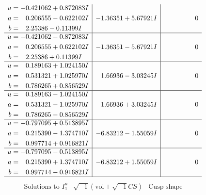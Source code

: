 \documentclass[1p]{elsarticle_modified}
\theoremstyle{definition}
\newcommand{\I}{\sqrt{-1}}
\begin{document}
$$\begin{array}{c|c|c}
\begin{aligned}
u &= -0.421062 + 0.872083 I \\
a &= \phantom{-}0.206555 - 0.622102 I \\
b &= \phantom{-}2.25386 - 0.11399 I\end{aligned}
 & -1.36351 + 5.67921 I & \phantom{-0.000000 } 0 \\ \hline\begin{aligned}
u &= -0.421062 - 0.872083 I \\
a &= \phantom{-}0.206555 + 0.622102 I \\
b &= \phantom{-}2.25386 + 0.11399 I\end{aligned}
 & -1.36351 - 5.67921 I & \phantom{-0.000000 } 0 \\ \hline\begin{aligned}
u &= \phantom{-}0.189163 + 1.024150 I \\
a &= \phantom{-}0.531321 + 1.025970 I \\
b &= \phantom{-}0.786265 + 0.856529 I\end{aligned}
 & \phantom{-}1.66936 - 3.03245 I & \phantom{-0.000000 } 0 \\ \hline\begin{aligned}
u &= \phantom{-}0.189163 - 1.024150 I \\
a &= \phantom{-}0.531321 - 1.025970 I \\
b &= \phantom{-}0.786265 - 0.856529 I\end{aligned}
 & \phantom{-}1.66936 + 3.03245 I & \phantom{-0.000000 } 0 \\ \hline\begin{aligned}
u &= -0.797095 + 0.513895 I \\
a &= \phantom{-}0.215390 - 1.374710 I \\
b &= \phantom{-}0.997714 + 0.916821 I\end{aligned}
 & -6.83212 - 1.55059 I & \phantom{-0.000000 } 0 \\ \hline\begin{aligned}
u &= -0.797095 - 0.513895 I \\
a &= \phantom{-}0.215390 + 1.374710 I \\
b &= \phantom{-}0.997714 - 0.916821 I\end{aligned}
 & -6.83212 + 1.55059 I & \phantom{-0.000000 } 0\\
 \hline 
 \end{array}$$\newpage$$\begin{array}{c|c|c}  
\text{Solutions to }I^u_{1}& \I (\text{vol} + \sqrt{-1}CS) & \text{Cusp shape}\\

\end{array}$$
\end{document}
